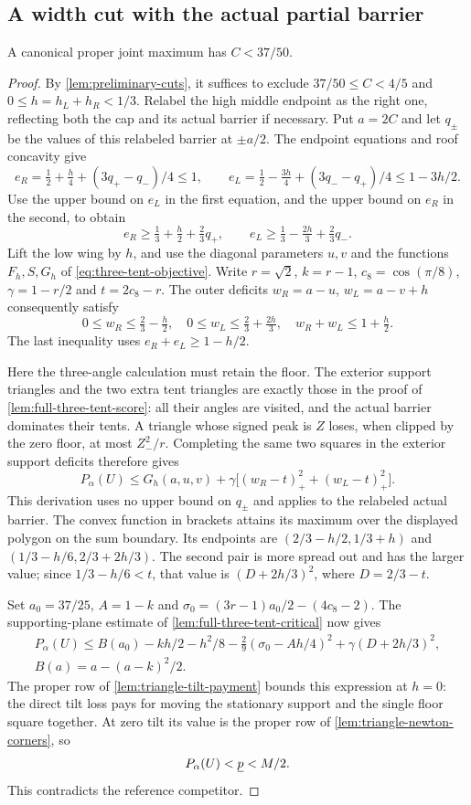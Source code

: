 \subsection{A width cut with the actual partial barrier}

\begin{proposition}\label{app:partial-width}
A canonical proper joint maximum has $C<37/50$.
\end{proposition}
\begin{proof}
By \cref{lem:preliminary-cuts}, it suffices to exclude
$37/50\le C<4/5$ and $0\le h=h_L+h_R<1/3$.
Relabel the high middle endpoint as the right one, reflecting both
the cap and its actual barrier if necessary. Put $a=2C$ and let
$q_\pm$ be the values of this relabeled barrier at $\pm a/2$.
The endpoint equations and roof concavity give
\[
 e_R=\tfrac12+\tfrac h4+(3q_+-q_-)/4\le1,\qquad
 e_L=\tfrac12-\tfrac{3h}4+(3q_--q_+)/4\le1-3h/2.
\]
Use the upper bound on $e_L$ in the first equation, and the upper
bound on $e_R$ in the second, to obtain
\[
 e_R\ge\tfrac13+\tfrac h2+\tfrac23q_+,\qquad
 e_L\ge\tfrac13-\tfrac{2h}3+\tfrac23q_-.
\]
Lift the low wing by $h$, and use the diagonal parameters $u,v$
and the functions $F_h,S,G_h$ of \eqref{eq:three-tent-objective}.
Write $r=\sqrt2$, $k=r-1$, $c_8=\cos(\pi/8)$,
$\gamma=1-r/2$ and $t=2c_8-r$. The outer deficits
$w_R=a-u$, $w_L=a-v+h$ consequently satisfy
\[
 0\le w_R\le\tfrac23-\tfrac h2,\quad
 0\le w_L\le\tfrac23+\tfrac{2h}3,\quad
 w_R+w_L\le1+\tfrac h2.
\]
The last inequality uses $e_R+e_L\ge1-h/2$.

Here the three-angle calculation must retain the floor. The exterior
support triangles and the two extra tent triangles are exactly those
in the proof of \cref{lem:full-three-tent-score}: all their angles
are visited, and the actual barrier dominates their tents. A triangle
whose signed peak is $Z$ loses, when clipped by the zero floor, at
most $Z_-^2/r$. Completing the same two squares in the exterior
support deficits therefore gives
\[
 P_\alpha(U)\le G_h(a,u,v)+
 \gamma\bigl[(w_R-t)_+^2+(w_L-t)_+^2\bigr].
\]
This derivation uses no upper bound on $q_\pm$ and applies to the
relabeled actual barrier. The convex function in brackets attains
its maximum over the displayed polygon on the sum boundary.
Its endpoints are
$(2/3-h/2,1/3+h)$ and $(1/3-h/6,2/3+2h/3)$.
The second pair is more spread out and has the larger value;
since $1/3-h/6<t$, that value is $(D+2h/3)^2$, where
$D=2/3-t$.

Set $a_0=37/25$, $A=1-k$ and
$\sigma_0=(3r-1)a_0/2-(4c_8-2)$.
The supporting-plane estimate of \cref{lem:full-three-tent-critical}
now gives
\[
 \begin{gathered}
 P_\alpha(U)\le B(a_0)-kh/2-h^2/8
       -\tfrac29(\sigma_0-Ah/4)^2+\gamma(D+2h/3)^2,
 \\
 B(a)=a-(a-k)^2/2.
 \end{gathered}
\]
The proper row of \cref{lem:triangle-tilt-payment} bounds this
expression at $h=0$: the direct tilt loss pays for moving the
stationary support and the single floor square together.
At zero tilt its value is the proper row of
\cref{lem:triangle-newton-corners}, so
\[
 P_\alpha(U)<\underline p<M/2.
\]
This contradicts the reference competitor.
\end{proof}

